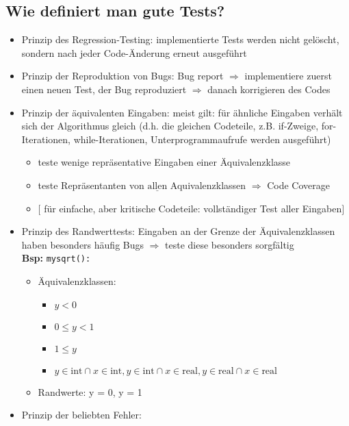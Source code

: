 \subsection{Wie definiert man gute Tests?}
\begin{itemize}
    \item Prinzip des Regression-Testing: implementierte Tests werden nicht gelöscht, sondern nach jeder Code-Änderung erneut ausgeführt
    \item Prinzip der Reproduktion von Bugs: Bug report $\Rightarrow$ implementiere zuerst einen neuen Test, der Bug reproduziert $\Rightarrow$ danach korrigieren des Codes
    \item Prinzip der äquivalenten Eingaben: meist gilt: für ähnliche Eingaben verhält sich der Algorithmus gleich (d.h. die gleichen Codeteile, z.B. if-Zweige, for-Iterationen, while-Iterationen, Unterprogrammaufrufe werden ausgeführt)
    \begin{itemize}[label={$\Rightarrow$}]
        \item teste wenige repräsentative Eingaben einer Äquivalenzklasse
        \item teste Repräsentanten von $\underline{\text{allen}}$ Aquivalenzklassen $\Rightarrow$ Code Coverage
        \item[] $\lbrack$ für einfache, aber kritische Codeteile: vollständiger Test aller Eingaben$\rbrack$
    \end{itemize}
    \item Prinzip des Randwerttests: Eingaben an der Grenze der Äquivalenzklassen haben besonders häufig Bugs $\Rightarrow$ teste diese besonders sorgfältig \\
    \textbf{Bsp:} \verb|mysqrt(): |
    \begin{itemize}
        \item Äquivalenzklassen:
        \begin{itemize}
            \item $y < 0$
            \item $0 \leq y < 1$
            \item $1 \leq y$
            \item $y \in \text{int} \cap x \in \text{int}, y \in \text{int} \cap x \in \text{real}, y \in \text{real}\cap x \in \text{real}$
            \end{itemize}
            \item Randwerte: y = 0, y = 1
            \end{itemize}
            \item Prinzip der \glqq beliebten Fehler\grqq:

\end{itemize}
